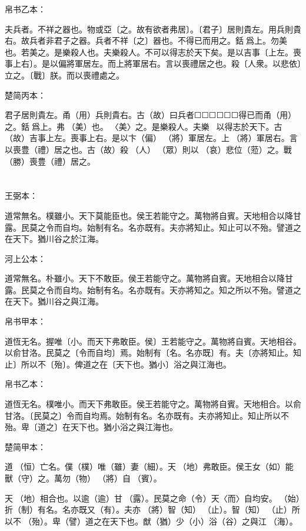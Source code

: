 \documentclass[a5paper]{ctexbook}
\begin{document}
    帛书乙本：

    夫兵者。不祥之器也。物或亞〔之。故有欲者弗居〕。〔君子〕居則貴左。用兵則貴右。故兵者非君子之器。兵者不祥〔之〕器也。不得已而用之。銛𢤱爲上。勿美也。若美之。是樂殺人也。夫樂殺人。不可以得志於天下矣。是以吉事〔上左。喪事上右〕。是以偏將軍居左。而上將軍居右。言以喪禮居之也。殺〔人衆。以悲依〕立之。〔戰〕朕。而以喪禮處之。

    楚简丙本：

    君子居則貴左。甬（用）兵則貴右。古（故）曰兵者☐☐☐☐☐☐得已而甬（用）之。銛󶵩爲上。弗󶴴（美）也。󶵪〈美〉之。是樂殺人。夫樂☐☐☐以得志於天下。古（故）吉事上左。喪事上右。是以卞（偏）𨟻（將）軍居左。上𨟻（將）軍居右。言以喪豊（禮）居之也。古（故）殺☐（人）☐（眾）則以𢙇（哀）悲位（蒞）之。戰󼡲（勝）喪豊（禮）居之。

    \chapter{}
    王弼本：

    道常無名。樸雖小。天下莫能臣也。侯王若能守之。萬物將自賓。天地相合以降甘露。民莫之令而自均。始制有名。名亦既有。夫亦將知止。知止可以不殆。譬道之在天下。猶川谷之於江海。

    河上公本：

    道常無名。朴雖小。天下不敢臣。侯王若能守之。萬物將自賓。天地相合以降甘露。民莫之令而自均。始制有名。名亦既有。天亦將知之。知之所以不殆。譬道之在天下。猶川谷之與江海。

    帛书甲本：

    道恆无名。握唯〔小。而天下弗敢臣。侯〕王若能守之。萬物將自賓。天地相谷。以俞甘洛。民莫之〔令而自均〕焉。始制有〔名。名亦既〕有。夫〔亦將知止。知止〕所以不〔殆〕。俾道之在〔天下也。猶小〕浴之與江海也。

    帛书乙本：

    道恆无名。樸唯小。而天下弗敢臣。侯王若能守之。萬物將自賓。天地相合。以俞甘洛。〔民莫之〕令而自均焉。始制有名。名亦既有。夫亦將知止。知止所以不殆。卑〔道之〕在天下也。猶小浴之與江海也。

    楚简甲本：

    道𠄨（恒）亡名。僕（樸）唯（雖）妻（細）。天󶴵（地）弗敢臣。侯王女（如）能獸（守）之。萬勿（物）𨟻（將）自󵦐（賓）。

    天󶴵（地）相合也。以逾（逾）甘𩂣（露）。民莫之命（令）天〈而〉自均安。󶴪（始）折（制）有名。名亦既又（有）。夫亦𨟻（將）智（知）𣥕（止）。智（知）𣥕（止）所以不󶴪（殆）。卑（譬）道之在天下也。猷（猶）少（小）浴（谷）之與江𣳠（海）。
\end{document}
